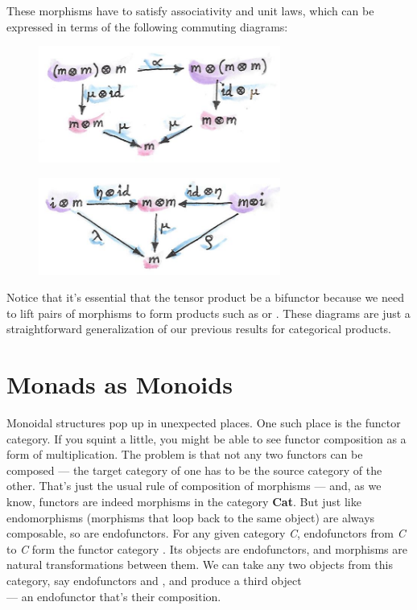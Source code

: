 \noindent
These morphisms have to satisfy associativity and unit laws, which can
be expressed in terms of the following commuting diagrams:

\begin{figure}[H]
\centering
\includegraphics[width=3.12500in]{images/assoctensor.jpg}
\end{figure}

\begin{figure}[H]
\centering
\includegraphics[width=3.12500in]{images/unitmon.jpg}
\end{figure}

\noindent
Notice that it's essential that the tensor product be a bifunctor
because we need to lift pairs of morphisms to form products such as
 or . These diagrams are just a
straightforward generalization of our previous results for categorical
products.

\section{Monads as Monoids}\label{monads-as-monoids}

Monoidal structures pop up in unexpected places. One such place is the
functor category. If you squint a little, you might be able to see
functor composition as a form of multiplication. The problem is that not
any two functors can be composed --- the target category of one has to
be the source category of the other. That's just the usual rule of
composition of morphisms --- and, as we know, functors are indeed
morphisms in the category \textbf{Cat}. But just like endomorphisms
(morphisms that loop back to the same object) are always composable, so
are endofunctors. For any given category \emph{C}, endofunctors from
\emph{C} to \emph{C} form the functor category \code{{[}C, C{]}}. Its
objects are endofunctors, and morphisms are natural transformations
between them. We can take any two objects from this category, say
endofunctors  and , and produce a third object\\
 --- an endofunctor that's their composition.

